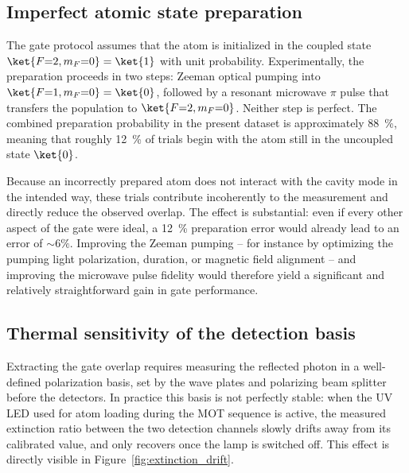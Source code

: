 \subsection{Imperfect atomic state preparation}
\label{subsubsec:state_preparation}

The gate protocol assumes that the atom is initialized in the coupled state $\ket{F{=}2, m_F{=}0}=\ket{1}$ with unit probability. Experimentally, the preparation proceeds in two steps: Zeeman optical pumping into $\ket{F{=}1, m_F{=}0}=\ket{0}$, followed by a resonant microwave $\pi$ pulse that transfers the population to $\ket{F{=}2, m_F{=}0}$. Neither step is perfect. The combined preparation probability in the present dataset is approximately \SI{88}{\percent}, meaning that roughly \SI{12}{\percent} of trials begin with the atom still in the uncoupled state $\ket{0}$.

Because an incorrectly prepared atom does not interact with the cavity mode in the intended way, these trials contribute incoherently to the measurement and directly reduce the observed overlap. The effect is substantial: even if every other aspect of the gate were ideal, a \SI{12}{\percent} preparation error would already lead to an error of $\sim6\%$. Improving the Zeeman pumping -- for instance by optimizing the pumping light polarization, duration, or magnetic field alignment -- and improving the microwave pulse fidelity would therefore yield a significant and relatively straightforward gain in gate performance.

\subsection{Thermal sensitivity of the detection basis}
\label{subsubsec:thermal_sensitivity}

Extracting the gate overlap requires measuring the reflected photon in a well-defined polarization basis, set by the wave plates and polarizing beam splitter before the detectors. In practice this basis is not perfectly stable: when the UV LED used for atom loading during the MOT sequence is active, the measured extinction ratio between the two detection channels slowly drifts away from its calibrated value, and only recovers once the lamp is switched off. This effect is directly visible in Figure~\ref{fig:extinction_drift}.

